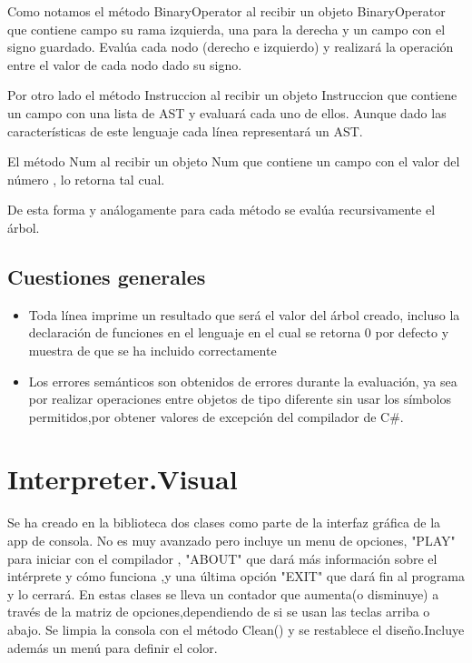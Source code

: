 \documentclass[a4paper,12pt]{article}
\begin{document}
 Como notamos el m\'etodo BinaryOperator al recibir un objeto BinaryOperator que contiene campo su rama izquierda, una para la derecha y un campo con el signo guardado. 
 Eval\'ua cada nodo (derecho e izquierdo) y realizar\'a la operaci\'on entre el valor de cada nodo dado su signo.

Por otro lado el m\'etodo Instruccion al recibir un objeto Instruccion que contiene  un campo con una lista de AST y evaluar\'a cada uno de ellos. Aunque dado las caracter\'isticas de este lenguaje cada l\'inea representar\'a un AST.

El m\'etodo Num al recibir un objeto Num que contiene un campo con el valor del n\'umero , lo retorna tal cual.

De esta forma y an\'alogamente para cada m\'etodo se eval\'ua recursivamente el \'arbol.

\subsection*{Cuestiones generales}

\begin{itemize}
    \item Toda l\'inea imprime un resultado que ser\'a el valor del \'arbol creado, incluso la declaraci\'on de funciones en el lenguaje en el cual se retorna 0 por defecto y muestra de que se ha incluido correctamente
    \item Los errores sem\'anticos son obtenidos de errores durante la evaluaci\'on, ya sea por realizar operaciones entre objetos de tipo diferente sin usar los s\'imbolos permitidos,por obtener valores de excepci\'on del compilador de C\#.
\end{itemize}

\section{Interpreter.Visual}\label{sec:intro}
Se ha creado en la biblioteca dos clases como parte de la interfaz gr\'afica de la app de consola. No es muy avanzado pero incluye un menu de opciones, "PLAY" para iniciar con el compilador , "ABOUT" que dar\'a m\'as informaci\'on sobre el int\'erprete y c\'omo funciona ,y una \'ultima opci\'on "EXIT" que dar\'a fin al programa y lo cerrar\'a. 
En estas clases se lleva un contador que aumenta(o disminuye) a trav\'es de la matriz de opciones,dependiendo de si se usan las teclas arriba o abajo. Se limpia la consola con el m\'etodo Clean() y se restablece el diseño.Incluye adem\'as un men\'u para definir el color.  
 
\end{document}
